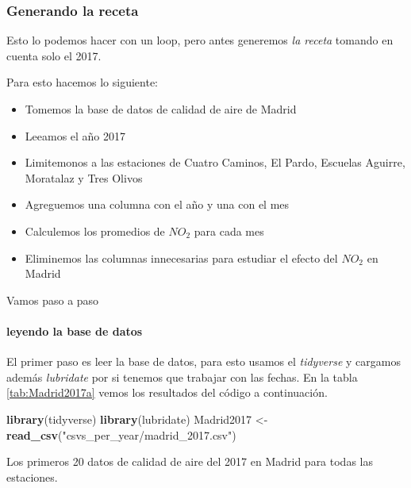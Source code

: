 \documentclass[]{book}
\newenvironment{Shaded}{\begin{snugshade}}{\end{snugshade}}
\newcommand{\KeywordTok}[1]{\textcolor[rgb]{0.13,0.29,0.53}{\textbf{#1}}}
\newcommand{\NormalTok}[1]{#1}
\newcommand{\StringTok}[1]{\textcolor[rgb]{0.31,0.60,0.02}{#1}}
\providecommand{\tightlist}{%
  \setlength{\itemsep}{0pt}\setlength{\parskip}{0pt}}
\let\oldparagraph\paragraph
\renewcommand{\paragraph}[1]{\oldparagraph{#1}\mbox{}}
\begin{document}
\hypertarget{generando-la-receta}{%
\subsubsection{Generando la receta}\label{generando-la-receta}}

Esto lo podemos hacer con un loop, pero antes generemos \emph{la receta}
tomando en cuenta solo el 2017.

Para esto hacemos lo siguiente:

\begin{itemize}
\tightlist
\item
  Tomemos la base de datos de calidad de aire de Madrid
\item
  Leeamos el año 2017
\item
  Limitemonos a las estaciones de Cuatro Caminos, El Pardo, Escuelas
  Aguirre, Moratalaz y Tres Olivos
\item
  Agreguemos una columna con el año y una con el mes
\item
  Calculemos los promedios de \(NO_2\) para cada mes
\item
  Eliminemos las columnas innecesarias para estudiar el efecto del
  \(NO_2\) en Madrid
\end{itemize}

Vamos paso a paso

\hypertarget{leyendo-la-base-de-datos}{%
\paragraph{leyendo la base de datos}\label{leyendo-la-base-de-datos}}

El primer paso es leer la base de datos, para esto usamos el
\emph{tidyverse} y cargamos además \emph{lubridate} por si tenemos que
trabajar con las fechas. En la tabla \ref{tab:Madrid2017a} vemos los
resultados del código a continuación.

\begin{Shaded}
\begin{Highlighting}[]
\KeywordTok{library}\NormalTok{(tidyverse)}
\KeywordTok{library}\NormalTok{(lubridate)}
\NormalTok{Madrid2017 <-}\StringTok{ }\KeywordTok{read_csv}\NormalTok{(}\StringTok{"csvs_per_year/madrid_2017.csv"}\NormalTok{)}
\end{Highlighting}
\end{Shaded}

\label{tab:Madrid2017a}Los primeros 20 datos de calidad de aire del 2017 en
Madrid para todas las estaciones.
\end{document}
